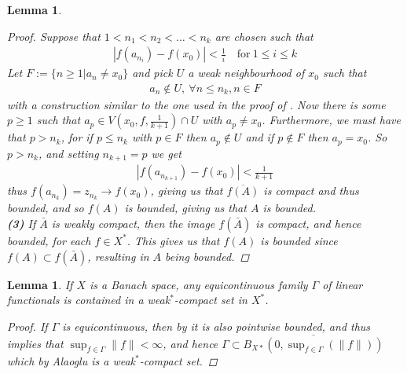 \documentclass[10pt,twoside,openany,final]{memoir}
\theoremstyle{break}
\newtheorem{lemma}[section]{Lemma}
\theoremstyle{Break}
\newcommand{\lv}{\lVert}
\newcommand{\rv}{\rVert}
\begin{document}
\begin{lemma}
\begin{proof}
Suppose that $1 < n_{1} < n_{2} < \dots < n_{k}$ are chosen such that 
\begin{align*}
|f(a_{n_{i}})-f(x_{0})| < \frac1i \quad \text{for} \ 1 \leq i \leq k
\end{align*}
Let $F:=\{n\geq 1 | a_{n} \neq x_{0}\}$ and pick $U$ a weak neighbourhood of $x_{0}$ such that 
\begin{align*}
a_{n} \not\in U, \ \forall n \leq n_{k}, n \in F
\end{align*} 
with a construction similar to the one used in the proof of .
Now there is some $p \geq 1$ such that $a_{p} \in V\left(x_{0},f,\frac{1}{k+1}\right)\cap U$ with $a_{p} \neq x_{0}$. Furthermore, we must have that $p > n_{k}$, for if $p \leq n_{k}$ with $p \in F$ then $a_{p} \not\in U$ and if $p \not\in F$ then $a_{p}=x_{0}$. So $p > n_{k}$, and setting $n_{k+1}=p$ we get 
\begin{align*}
|f(a_{n_{k+1}})-f(x_{0})| < \frac{1}{k+1}
\end{align*}
thus $f(a_{n_{k}})=z_{n_{k}} \to f(x_{0})$, giving us that $\overline{f(A)}$ is compact and thus bounded, and so $f(A)$ is bounded, giving us that $A$ is bounded. \\

\textbf{(3)}
    If $\bar{A}$ is weakly compact, then the image $f(\bar{A})$ is compact, and hence bounded, for each $f\in X^*$. This gives us that $f(A)$ is bounded since $f(A)\subset f(\bar{A})$, resulting in $A$ being bounded.
\end{proof}
\end{lemma}

\begin{lemma} \label{equicont w* compact}
If $X$ is a Banach space, any equicontinuous family $\Gamma$ of linear functionals is contained in a weak$^*$-compact set in $X^*$.
\begin{proof}
If $\Gamma$ is equicontinuous, then by  it is also pointwise bounded, and thus  implies that $\sup_{f \in \Gamma} \lv f \rv < \infty$, and hence $\displaystyle \Gamma \subset  \overline{B_{X*}(0,\sup_{f \in \Gamma}(\lv f \rv))} $ which by Alaoglu is a weak$^*$-compact set.
%
\end{proof}
\end{lemma}
\end{document}
